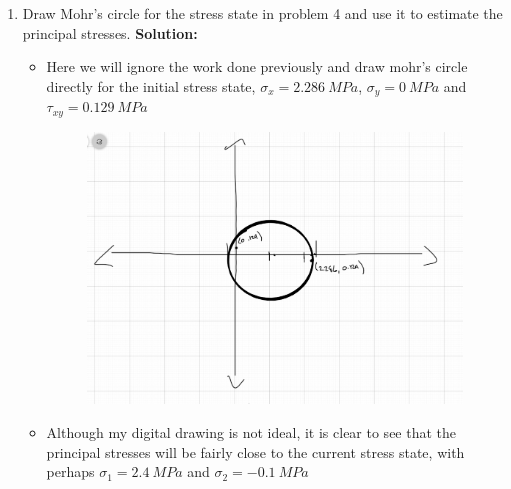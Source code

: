 \documentclass[12pt, oneside]{article}
\begin{document}
\begin{enumerate}
	\item Draw Mohr's circle for the stress state in problem 4 and use it to estimate the principal stresses.
			\textbf{Solution:}
			\begin{itemize}
				\item Here we will ignore the work done previously and draw mohr's circle directly for the initial stress state, $\sigma_x = 	\SI{2.286 }{MPa} $, $\sigma_y = 	\SI{0}{MPa} $ and $\tau_{xy} = 	\SI{0.129}{MPa} $
					\begin{figure}[H]
						\centering
						\includegraphics[width=0.6\linewidth]{mohr}
					\end{figure}
				\item Although my digital drawing is not ideal, it is clear to see that the principal stresses will be fairly close to the current stress state, with perhaps $\sigma_1 = 	\SI{2.4 }{MPa} $ and $\sigma_2 = 	\SI{-0.1}{MPa} $
			\end{itemize}


\end{enumerate}
\end{document}
